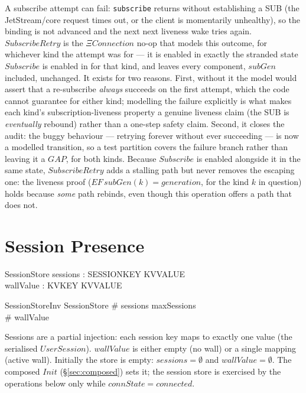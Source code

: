 \documentclass[a4paper,10pt,fleqn]{article}
\begin{document}
A subscribe attempt can fail: \texttt{subscribe} returns without
establishing a SUB (the JetStream/core request times out, or the client
is momentarily unhealthy), so the binding is not advanced and the next
next liveness wake tries again.  $SubscribeRetry$ is the $\Xi Connection$ no-op that
models this outcome, for whichever kind the attempt was for --- it is
enabled in exactly the stranded state $Subscribe$ is enabled in for that
kind, and leaves every component, $subGen$ included, unchanged.  It
exists for two reasons.  First, without it the model would assert that a
re-subscribe \emph{always} succeeds on the first attempt, which the code
cannot guarantee for either kind; modelling the failure explicitly is
what makes each kind's subscription-liveness property a genuine liveness
claim (the SUB is \emph{eventually} rebound) rather than a one-step
safety claim.  Second, it closes the audit: the buggy behaviour ---
retrying forever without ever succeeding --- is now a modelled
transition, so a test partition covers the failure branch rather than
leaving it a $GAP$, for both kinds.  Because $Subscribe$ is enabled
alongside it in the same state, $SubscribeRetry$ adds a stalling path but
never removes the escaping one: the liveness proof ($EF\,subGen(k) =
generation$, for the kind $k$ in question) holds because \emph{some} path
rebinds, even though this operation offers a path that does not.

\section{Session Presence}

\begin{schema}{SessionStore}
  sessions : SESSIONKEY \pinj KVVALUE \\
  wallValue : KVKEY \pfun KVVALUE
\end{schema}

\begin{schema}{SessionStoreInv}
  SessionStore
  \where
  \# sessions \leq maxSessions \\
  \# wallValue 
\end{schema}

Sessions are a partial injection: each session key maps to
exactly one value (the serialised $UserSession$).  $wallValue$
is either empty (no wall) or a single mapping (active wall).
Initially the store is empty: $sessions = \emptyset$ and
$wallValue = \emptyset$.  The composed $Init$ (\S\ref{sec:composed}) sets it;
the session store is exercised by the operations below only while
$connState = connected$.
\end{document}
